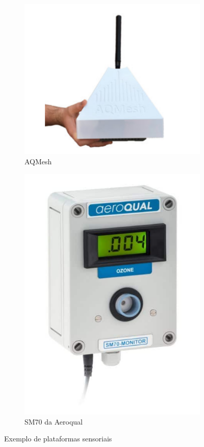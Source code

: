 \documentclass[12pt]{article}
\begin{document}
\begin{figure}[h!]
  \centering
  \begin{subfigure}[b]{0.5\linewidth}
    \includegraphics[width=\linewidth]{imgs/aqmesh.png}
    \caption{AQMesh}
  \end{subfigure}
  \begin{subfigure}[b]{0.3\linewidth}
    \includegraphics[width=\linewidth]{imgs/airqplat.png}
    \caption{SM70 da Aeroqual}
  \end{subfigure}
  \caption{Exemplo de plataformas sensoriais}
  \label{fig:aeroplats}
\end{figure}
\end{document}
